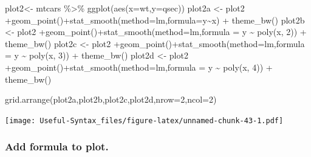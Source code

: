 \documentclass[
]{article}
\newenvironment{Shaded}{\begin{snugshade}}{\end{snugshade}}
\newcommand{\AttributeTok}[1]{\textcolor[rgb]{0.77,0.63,0.00}{#1}}
\newcommand{\DecValTok}[1]{\textcolor[rgb]{0.00,0.00,0.81}{#1}}
\newcommand{\FunctionTok}[1]{\textcolor[rgb]{0.00,0.00,0.00}{#1}}
\newcommand{\NormalTok}[1]{#1}
\newcommand{\OtherTok}[1]{\textcolor[rgb]{0.56,0.35,0.01}{#1}}
\newcommand{\SpecialCharTok}[1]{\textcolor[rgb]{0.00,0.00,0.00}{#1}}
\newcommand{\StringTok}[1]{\textcolor[rgb]{0.31,0.60,0.02}{#1}}
\begin{document}
\begin{Shaded}
\begin{Highlighting}[]
\NormalTok{plot2}\OtherTok{\textless{}{-}}\NormalTok{ mtcars }\SpecialCharTok{\%\textgreater{}\%} \FunctionTok{ggplot}\NormalTok{(}\FunctionTok{aes}\NormalTok{(}\AttributeTok{x=}\NormalTok{wt,}\AttributeTok{y=}\NormalTok{qsec))}
\NormalTok{plot2a }\OtherTok{\textless{}{-}}\NormalTok{ plot2 }\SpecialCharTok{+}\FunctionTok{geom\_point}\NormalTok{()}\SpecialCharTok{+}\FunctionTok{stat\_smooth}\NormalTok{(}\AttributeTok{method=}\StringTok{\textquotesingle{}lm\textquotesingle{}}\NormalTok{,}\AttributeTok{formula=}\NormalTok{y}\SpecialCharTok{\textasciitilde{}}\NormalTok{x) }\SpecialCharTok{+} \FunctionTok{theme\_bw}\NormalTok{()}
\NormalTok{plot2b }\OtherTok{\textless{}{-}}\NormalTok{ plot2 }\SpecialCharTok{+}\FunctionTok{geom\_point}\NormalTok{()}\SpecialCharTok{+}\FunctionTok{stat\_smooth}\NormalTok{(}\AttributeTok{method=}\StringTok{\textquotesingle{}lm\textquotesingle{}}\NormalTok{,}\AttributeTok{formula =}\NormalTok{ y }\SpecialCharTok{\textasciitilde{}} \FunctionTok{poly}\NormalTok{(x, }\DecValTok{2}\NormalTok{)) }\SpecialCharTok{+} \FunctionTok{theme\_bw}\NormalTok{()}
\NormalTok{plot2c }\OtherTok{\textless{}{-}}\NormalTok{ plot2 }\SpecialCharTok{+}\FunctionTok{geom\_point}\NormalTok{()}\SpecialCharTok{+}\FunctionTok{stat\_smooth}\NormalTok{(}\AttributeTok{method=}\StringTok{\textquotesingle{}lm\textquotesingle{}}\NormalTok{,}\AttributeTok{formula =}\NormalTok{ y }\SpecialCharTok{\textasciitilde{}} \FunctionTok{poly}\NormalTok{(x, }\DecValTok{3}\NormalTok{)) }\SpecialCharTok{+} \FunctionTok{theme\_bw}\NormalTok{()}
\NormalTok{plot2d }\OtherTok{\textless{}{-}}\NormalTok{ plot2 }\SpecialCharTok{+}\FunctionTok{geom\_point}\NormalTok{()}\SpecialCharTok{+}\FunctionTok{stat\_smooth}\NormalTok{(}\AttributeTok{method=}\StringTok{\textquotesingle{}lm\textquotesingle{}}\NormalTok{,}\AttributeTok{formula =}\NormalTok{ y }\SpecialCharTok{\textasciitilde{}} \FunctionTok{poly}\NormalTok{(x, }\DecValTok{4}\NormalTok{)) }\SpecialCharTok{+} \FunctionTok{theme\_bw}\NormalTok{()}

\FunctionTok{grid.arrange}\NormalTok{(plot2a,plot2b,plot2c,plot2d,}\AttributeTok{nrow=}\DecValTok{2}\NormalTok{,}\AttributeTok{ncol=}\DecValTok{2}\NormalTok{)}
\end{Highlighting}
\end{Shaded}

\texttt{[image: Useful-Syntax\_files/figure-latex/unnamed-chunk-43-1.pdf]}

\hypertarget{add-formula-to-plot.}{%
\subsubsection{Add formula to plot.}\label{add-formula-to-plot.}}
\end{document}
